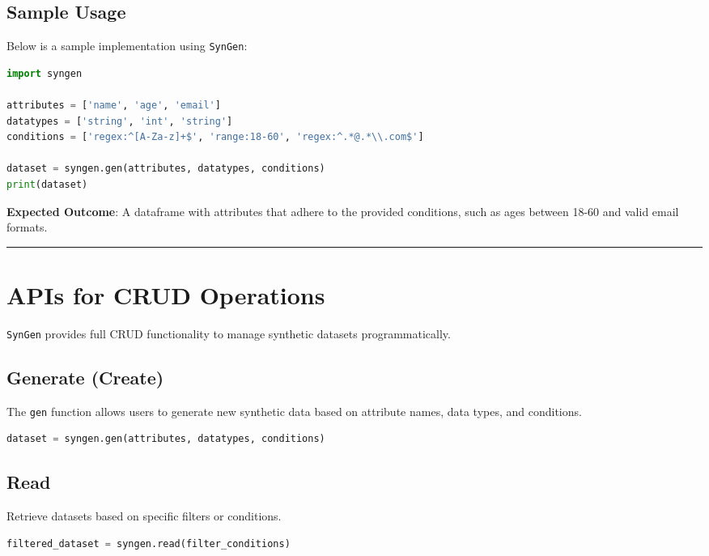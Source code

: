 \documentclass{article}
\newcommand{\horizbar}{
    \vspace{1em}
    \hrule height 1pt
    \vspace{1em}
}
\begin{document}
    \subsection{Sample Usage}
    Below is a sample implementation using \texttt{SynGen}:

    \begin{lstlisting}[language=Python, caption=Sample Usage of SynGen]
import syngen

attributes = ['name', 'age', 'email']
datatypes = ['string', 'int', 'string']
conditions = ['regex:^[A-Za-z]+$', 'range:18-60', 'regex:^.*@.*\\.com$']

dataset = syngen.gen(attributes, datatypes, conditions)
print(dataset)
    \end{lstlisting}

    \noindent\textbf{Expected Outcome}: A dataframe with attributes that adhere to the provided conditions, such as ages between 18-60 and valid email formats.

    \horizbar


    \section{APIs for CRUD Operations}
    \texttt{SynGen} provides full CRUD functionality to manage synthetic datasets programmatically.

    \subsection{Generate (Create)}
    The \texttt{gen} function allows users to generate new synthetic data based on attribute names, data types, and conditions.

    \begin{lstlisting}[language=Python, caption=API Example: Gen (Create)]
dataset = syngen.gen(attributes, datatypes, conditions)
    \end{lstlisting}

    \subsection{Read}
    Retrieve datasets based on specific filters or conditions.

    \begin{lstlisting}[language=Python, caption=API Example: Read]
filtered_dataset = syngen.read(filter_conditions)
    \end{lstlisting}
\end{document}
